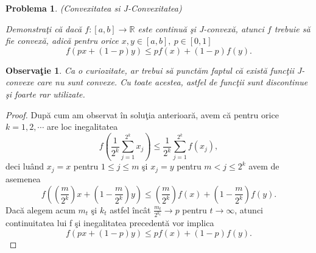 \documentclass[a4paper,12pt,oneside]{report}
\newtheorem{problem}{Problema}
\newtheorem{remark}{Observa\c{t}ie}
\begin{document}
\begin{problem}  (Convexitatea si J-Convexitatea)

Demonstra\c{t}i c\u{a} dac\u{a} \(f : \left [ a,b \right ]\rightarrow \mathbb{R} \) este continu\u{a} \c{s}i J-convex\u{a}, atunci \(f\) trebuie s\u{a} fie convex\u{a}, adic\u{a} pentru orice $x, y\in [a,b],~ p\in [0,1]$
\begin{displaymath}
  f\left ( px + \left ( 1 - p \right )y \right )\leq pf\left ( x \right ) + \left ( 1-p \right )f\left ( y \right).
\end{displaymath}
\end{problem}
\begin{remark}
Ca o curiozitate, ar trebui s\u{a} punct\u{a}m faptul c\u{a} exist\u{a} func\c{t}ii J-convexe care nu sunt convexe. Cu toate acestea, astfel de func\c{t}ii sunt discontinue \c{s}i foarte rar utilizate.
\end{remark}
\begin{proof}
Dup\u{a} cum am observat \^{i}n solu\c{t}ia anterioar\u{a}, avem c\u{a} pentru orice \(k = 1,2,\cdots\) are loc inegalitatea
\begin{displaymath}
  f\left ( \frac{1}{2^{k}} \sum_{j = 1}^{2^{k}}x_{j}\right ) \leq  \frac{1}{2^{k}}\sum_{j = 1}^{2^{k}}f\left ( x_{j}\right ),
\end{displaymath}
deci lu\^{a}nd \(x_{j} = x\) pentru \(1\leq j\leq m\) \c{s}i \(x_{j} = y\) pentru \(m< j\leq 2^{k}\) avem de asemenea
\begin{displaymath}
  f\left ( \left ( \frac{m}{2^{k}} \right )x + \left ( 1 - \frac{m}{2^{k}} \right )y \right )\leq \left ( \frac{m}{2^{k}} \right )f\left ( x \right ) + \left ( 1 - \frac{m}{2^{k}} \right )f\left ( y \right ).
\end{displaymath}
Dac\u{a} alegem acum \(m_{t}\) \c{s}i \(k_{t}\) astfel \^{i}nc\^{a}t \(\frac{m_{t}}{2^{k_{t}}} \rightarrow p\) pentru \(t \rightarrow \infty\), atunci continuitatea lui f \c{s}i inegalitatea precedent\u{a} vor implica
\begin{displaymath}
  f\left ( px + \left ( 1 - p \right )y \right ) \leq  pf\left ( x \right ) + \left ( 1 - p \right )f\left ( y \right ).
\end{displaymath}
\end{proof}
\end{document}
